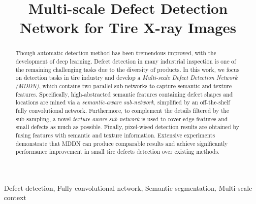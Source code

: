 \documentclass{article}
\title{Multi-scale Defect Detection Network for Tire X-ray Images}
\begin{document}

\maketitle

\begin{abstract}
Though automatic detection method has been tremendous improved, with the development of deep learning. Defect detection in many industrial inspection is one of the remaining challenging tasks due to the diversity of products. In this work, we focus on detection tasks in tire industry and develop a {\it Multi-scale Defect Detection Network (MDDN)}, which contains two parallel sub-networks to capture semantic and texture features. Specifically, high-abstracted semantic features containing defect shapes and locations are mined via a {\it semantic-aware sub-network}, simplified by an off-the-shelf fully convolutional network. Furthermore, to complement the details filtered by the sub-sampling, a novel {\it texture-aware sub-network} is used to cover edge features and small defects as much as possible. Finally, pixel-wised detection results are obtained by fusing features with semantic and texture information. Extensive experiments demonstrate that MDDN can produce comparable results and achieve significantly performance improvement in small tire defects detection over existing methods.
\end{abstract}

\begin{keywords}
Defect detection, Fully convolutional network, Semantic segmentation, Multi-scale context
\end{keywords}
\end{document}
